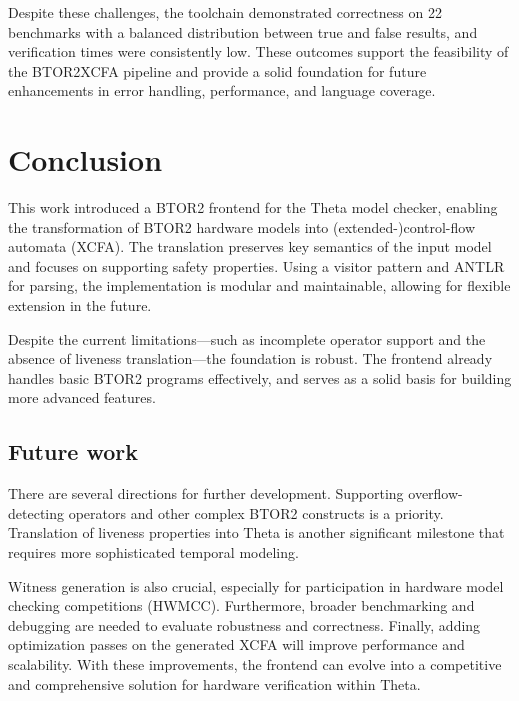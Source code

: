 Despite these challenges, the toolchain demonstrated correctness on 22 benchmarks with a balanced distribution between true and false results, and verification times were consistently low. These outcomes support the feasibility of the BTOR2XCFA pipeline and provide a solid foundation for future enhancements in error handling, performance, and language coverage.

\section{Conclusion}
This work introduced a BTOR2 frontend for the Theta model checker, enabling the transformation of BTOR2 hardware models into (extended-)control-flow automata (XCFA). The translation preserves key semantics of the input model and focuses on supporting safety properties. Using a visitor pattern and ANTLR for parsing, the implementation is modular and maintainable, allowing for flexible extension in the future.

Despite the current limitations—such as incomplete operator support and the absence of liveness translation—the foundation is robust. The frontend already handles basic BTOR2 programs effectively, and serves as a solid basis for building more advanced features.

\subsection{Future work}
There are several directions for further development. Supporting overflow-detecting operators and other complex BTOR2 constructs is a priority. Translation of liveness properties into Theta is another significant milestone that requires more sophisticated temporal modeling.

Witness generation is also crucial, especially for participation in hardware model checking competitions (HWMCC). Furthermore, broader benchmarking and debugging are needed to evaluate robustness and correctness. Finally, adding optimization passes on the generated XCFA will improve performance and scalability. With these improvements, the frontend can evolve into a competitive and comprehensive solution for hardware verification within Theta.
